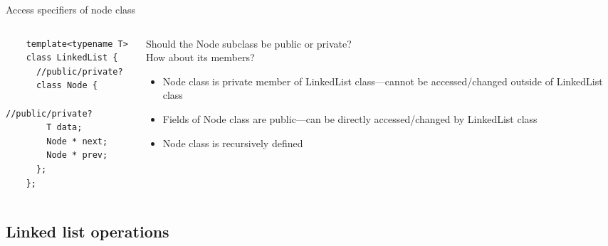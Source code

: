 \documentclass[aspectratio=169]{beamer}
\begin{document}

\begin{frame}[fragile]{Access specifiers of node class}
  \begin{columns}
  \begin{column}{0.45\textwidth}
  \begin{lstlisting}
    template<typename T>
    class LinkedList {
      //public/private?
      class Node {
        //public/private?
        T data;
        Node * next;
        Node * prev;
      };
    };
  \end{lstlisting}
  \end{column}

  \begin{column}{0.55\textwidth}
  \begin{block}{Should the Node subclass be public or private?
      \\How about its members?}
    \begin{itemize}
    \item<2-> Node class is private member of LinkedList class---cannot be accessed/changed outside of LinkedList class
    \item<3-> Fields of Node class are public---can be directly accessed/changed by LinkedList class
    \item<4-> Node class is recursively defined
    \end{itemize}
  \end{block}
  \end{column}
  \end{columns}
\end{frame}

\subsection{Linked list operations}

\end{document}
